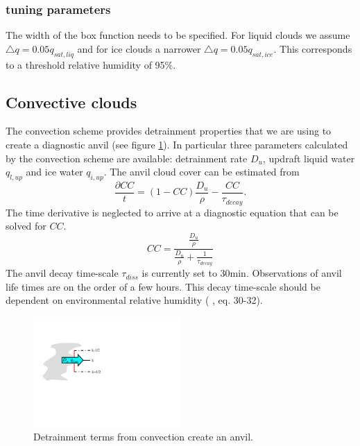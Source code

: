 \documentclass[a4paper,11pt]{article}
\newcommand{\citeNP}[1]{\citeauthor{#1} \citeyear{#1}}
\begin{document}
\subsubsection{tuning parameters}

The width of the box function needs to be specified.  For liquid clouds we assume $\triangle q = 0.05 q_{sat,liq}$
and for ice clouds a narrower $\triangle q = 0.05 q_{sat,ice}$.  This corresponds to a threshold 
relative humidity of 95\%.


\subsection{Convective clouds}

The \cite{tiedtke:1989} convection scheme provides detrainment properties that we are using to create a diagnostic anvil
(see figure \ref{fg:anvil}).  In particular three parameters calculated by the convection scheme are available:
detrainment rate $D_u$, updraft liquid water $q_{l,up}$ and ice water $q_{i,up}$.  The anvil cloud cover can
be estimated from
%
\begin{equation}
\frac{\partial CC}{t} = (1-CC) \frac{D_u}{\rho} - \frac{CC}{\tau_{decay}}.
\label{eq:decay}
\end{equation}
%
The time derivative is neglected to arrive at a diagnostic equation that can be solved for $CC$.  
%
\begin{equation}
CC= \frac{\frac{D_u}{\rho}}{\frac{D_u}{\rho} + \frac{1}{\tau_{decay}}}
\label{eq:decay2}
\end{equation}
%
The anvil decay time-scale $\tau_{diss}$ is currently set to 30min.  
Observations of anvil life times are on the order of a few hours.   
This decay time-scale should be dependent on environmental 
relative humidity (\citeNP{tiedtke:1993}, eq. 30-32).

\begin{figure}[t]
\centering
\includegraphics*[width=0.5\textwidth,bb=40 225 330 420] {detrainment_anvil.pdf}
\caption{Detrainment terms from convection create an anvil.}
\label{fg:anvil}
\end{figure}
\end{document}
